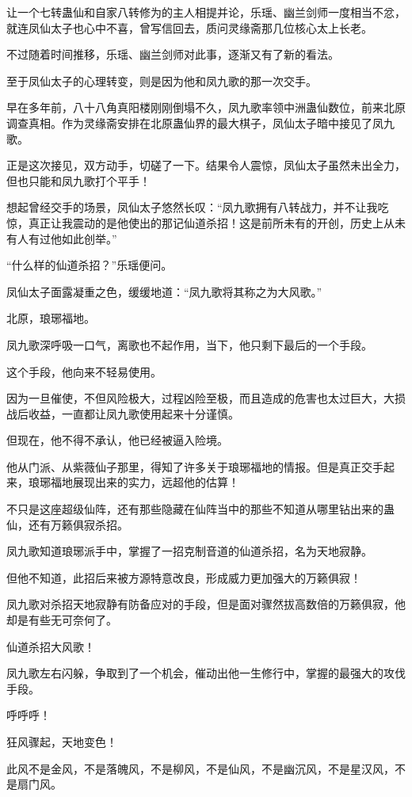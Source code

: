 \begin{this_body}
让一个七转蛊仙和自家八转修为的主人相提并论，乐瑶、幽兰剑师一度相当不忿，就连凤仙太子也心中不喜，曾写信回去，质问灵缘斋那几位核心太上长老。

不过随着时间推移，乐瑶、幽兰剑师对此事，逐渐又有了新的看法。

至于凤仙太子的心理转变，则是因为他和凤九歌的那一次交手。

早在多年前，八十八角真阳楼刚刚倒塌不久，凤九歌率领中洲蛊仙数位，前来北原调查真相。作为灵缘斋安排在北原蛊仙界的最大棋子，凤仙太子暗中接见了凤九歌。

正是这次接见，双方动手，切磋了一下。结果令人震惊，凤仙太子虽然未出全力，但也只能和凤九歌打个平手！

想起曾经交手的场景，凤仙太子悠然长叹：“凤九歌拥有八转战力，并不让我吃惊，真正让我震动的是他使出的那记仙道杀招！这是前所未有的开创，历史上从未有人有过他如此创举。”

“什么样的仙道杀招？”乐瑶便问。

凤仙太子面露凝重之色，缓缓地道：“凤九歌将其称之为大风歌。”

北原，琅琊福地。

凤九歌深呼吸一口气，离歌也不起作用，当下，他只剩下最后的一个手段。

这个手段，他向来不轻易使用。

因为一旦催使，不但风险极大，过程凶险至极，而且造成的危害也太过巨大，大损战后收益，一直都让凤九歌使用起来十分谨慎。

但现在，他不得不承认，他已经被逼入险境。

他从门派、从紫薇仙子那里，得知了许多关于琅琊福地的情报。但是真正交手起来，琅琊福地展现出来的实力，远超他的估算！

不只是这座超级仙阵，还有那些隐藏在仙阵当中的那些不知道从哪里钻出来的蛊仙，还有万籁俱寂杀招。

凤九歌知道琅琊派手中，掌握了一招克制音道的仙道杀招，名为天地寂静。

但他不知道，此招后来被方源特意改良，形成威力更加强大的万籁俱寂！

凤九歌对杀招天地寂静有防备应对的手段，但是面对骤然拔高数倍的万籁俱寂，他却是有些无可奈何了。

仙道杀招大风歌！

凤九歌左右闪躲，争取到了一个机会，催动出他一生修行中，掌握的最强大的攻伐手段。

呼呼呼！

狂风骤起，天地变色！

此风不是金风，不是落魄风，不是柳风，不是仙风，不是幽沉风，不是星汉风，不是扇门风。


\end{this_body}

